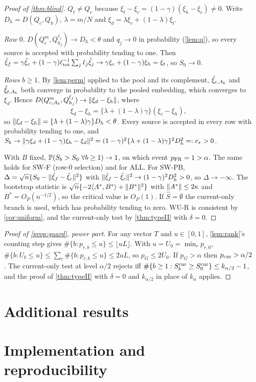 \documentclass[11pt,a4paper]{article}
\begin{document}
\begin{proof}[Proof of \cref{thm:blind}]
$Q_t\ne Q_c$ because $\xi_t-\xi_c=(1-\gamma)(\xi_h-\xi_c)\neq0$. Write $D_h=D(Q_c,Q_h)$, $\lambda=m/N$ and $\xi_d=\lambda\xi_c+(1-\lambda)\xi_t$.

\emph{Row $0$.} $D(Q^m_c,Q^{\ell_j}_{h_j})\to D_h<\theta$ and $q_j\to0$ in probability (\cref{lem:q}), so every source is accepted with probability tending to one. Then $\hxi_f=\gamma\hxi_c+(1-\gamma)\ell_{\rm tot}^{-1}\sum_j\ell_j\hxi_j\to\gamma\xi_c+(1-\gamma)\xi_h=\xi_t$, so $S_0\to0$.

\emph{Rows $b\ge1$.} By \cref{lem:perm} applied to the pool and its complement, $\hxi_{c,A_b}$ and $\hxi_{t,A_b}$ both converge in probability to the pooled embedding, which converges to $\xi_d$. Hence $D(Q^m_{c,A_b},Q_{h_j}^{\ell_j})\to\norm{\xi_d-\xi_h}$, where
\[
\xi_d-\xi_h=\{\lambda+(1-\lambda)\gamma\}(\xi_c-\xi_h),
\]
so $\norm{\xi_d-\xi_h}=\{\lambda+(1-\lambda)\gamma\}D_h<\theta$. Every source is accepted in every row with probability tending to one, and $S_b\to\norm{\gamma\xi_d+(1-\gamma)\xi_h-\xi_d}^2=(1-\gamma)^2\{\lambda+(1-\lambda)\gamma\}^2D_h^2=:c_\ast>0$.

With $B$ fixed, $\P(S_b>S_0\ \forall b\ge1)\to1$, on which event $p_{\rm FR}=1>\alpha$. The same holds for SW-F (row-$0$ selection) and for ALL. For SW-PB, $\Delta=\sqrt n\{S_0-\norm{\hxi_f-\hxi_c}^2\}$ with $\norm{\hxi_f-\hxi_c}^2\to(1-\gamma)^2D_h^2>0$, so $\Delta\to-\infty$. The bootstrap statistic is $\sqrt n\{-2\ip{A^\ast}{B^\ast}+\norm{B^\ast}^2\}$ with $\norm{A^\ast}\le2\kappa$ and $B^\ast=O_P(n^{-1/2})$, so the critical value is $O_P(1)$. If $\hat S=\emptyset$ the current-only branch is used, which has probability tending to zero. WU-R is consistent by \cref{cor:uniform}, and the current-only test by \cref{thm:typeII} with $\delta=0$.
\end{proof}

\begin{proof}[Proof of \cref{prop:guard}, power part]
For any vector $T$ and $u\in[0,1]$, \cref{lem:rank}'s counting step gives $\#\{b:p_{r,b}\le u\}\le\lfloor uL\rfloor$. With $u=U_0=\min_rp_{r,0}$, $\#\{b:U_b\le u\}\le\sum_r\#\{b:p_{r,b}\le u\}\le2uL$, so $p_G\le2U_0$. If $p_G>\alpha$ then $p_{\rm cur}>\alpha/2$. The current-only test at level $\alpha/2$ rejects iff $\#\{b\ge1:S^{\rm cur}_b\ge S^{\rm cur}_0\}\le k_{\alpha/2}-1$, and the proof of \cref{thm:typeII} with $\delta=0$ and $k_{\alpha/2}$ in place of $k_\alpha$ applies.
\end{proof}

\section{Additional results}\label{app:additional}


\section{Implementation and reproducibility}\label{app:repro}


\FloatBarrier
\clearpage

\end{document}
